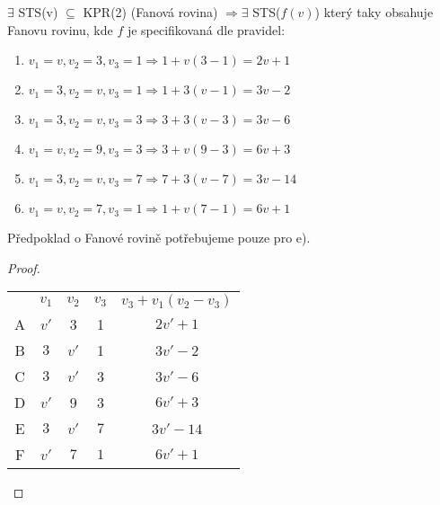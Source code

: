 	\begin{lemma}
		$\exists$ STS(v) $\subseteq$ KPR(2) (Fanová rovina) $\Rightarrow \exists$ STS($f(v)$) který taky obsahuje Fanovu rovinu, kde $f$ je specifikovaná dle pravidel:
		\begin{enumerate}[label=\alph*)]
			\item $v_1 = v, v_2 = 3, v_3 = 1 \Rightarrow 1 + v (3 - 1) = 2v + 1$
			\item $v_1 = 3, v_2 = v, v_3 = 1 \Rightarrow 1 + 3(v - 1) = 3v - 2$
			\item $v_1 = 3, v_2 = v, v_3 = 3 \Rightarrow 3 + 3(v - 3) = 3v - 6$
			\item $v_1 = v, v_2 = 9, v_3 = 3 \Rightarrow 3 + v(9 - 3) = 6v + 3$
			\item $v_1 = 3, v_2 = v, v_3 = 7 \Rightarrow 7 + 3 (v - 7) = 3v - 14$
			\item $v_1 = v, v_2 = 7, v_3 = 1 \Rightarrow 1 + v(7 - 1) = 6v + 1$
		\end{enumerate}
		Předpoklad o Fanové rovině potřebujeme pouze pro e).
	\end{lemma}
	\begin{proof}
    \begin{tabular}{c|ccc|c}
          & $v_1$ & $v_2$ & $v_3$ & $v_3+v_1(v_2-v_3)$\\
        A & $v'$  & 3     & 1     & $2v'+1$\\
        B & $3$   & $v'$  & 1     & $3v'-2$\\
        C & $3$   & $v'$  & 3     & $3v'-6$\\
        D & $v'$  & 9     & 3     & $6v'+3$\\
        E & $3$   & $v'$  & $7$   & $3v'-14$\\
        F & $v'$  & $7$   & $1$   & $6v'+1$
    \end{tabular}
	\end{proof}


